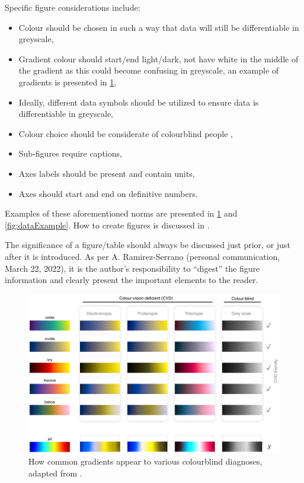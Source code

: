 \noindent
Specific figure considerations include: 
\begin{itemize}
	\item Colour should be chosen in such a way that data will still be differentiable in greyscale,
	\item Gradient colour should start/end light/dark, not have white in the middle of the gradient as this could become confusing in greyscale, an example of gradients is presented in \cref{fig:gradientExample},
	\item Ideally, different data symbols should be utilized to ensure data is differentiable in greyscale, 
	\item Colour choice should be considerate of colourblind people \cite{colourScienceMisuse},
	\item Sub-figures require captions, 
	\item Axes labels should be present and contain units, 
	\item Axes should start and end on definitive numbers. 
\end{itemize}

\noindent
Examples of these aforementioned norms are presented in \cref{fig:gradientExample} and \ref{fig:dataExample}. 
How to create figures is discussed in . 

The significance of a figure/table should always be discussed just prior, or just after it is introduced. 
As per A. Ramirez-Serrano (personal communication, March 22, 2022), it is the author's responsibility to ``digest'' the figure information and clearly present the important elements to the reader. 


\begin{figure}[hbt!]
	\centering
	\captionsetup{width=\textwidth}
	\includegraphics[width=\textwidth]{Photos/Figures/gradients.png}
	\caption{How common gradients appear to various colourblind diagnoses, adapted from \citeauthor{colourScienceMisuse} \cite{colourScienceMisuse}.}
	\label{fig:gradientExample}
	\hfill
\end{figure}



